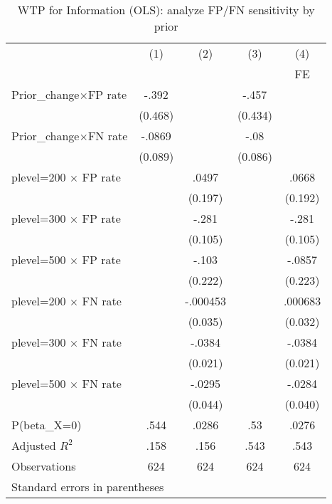 \begin{table}[htbp]\centering
\caption{WTP for Information (OLS): analyze FP/FN sensitivity by prior}
\begin{tabular}{l*{4}{c}}
\hline\hline
                &\multicolumn{1}{c}{(1)}&\multicolumn{1}{c}{(2)}&\multicolumn{1}{c}{(3)}&\multicolumn{1}{c}{(4)}\\
                &\multicolumn{1}{c}{}&\multicolumn{1}{c}{}&\multicolumn{1}{c}{}&\multicolumn{1}{c}{FE}\\
\hline
Prior\_change$\times$FP rate&    -.392&         &    -.457&         \\
                &  (0.468)&         &  (0.434)&         \\
Prior\_change$\times$FN rate&   -.0869&         &     -.08&         \\
                &  (0.089)&         &  (0.086)&         \\
plevel=200 $\times$ FP rate&         &    .0497&         &    .0668\\
                &         &  (0.197)&         &  (0.192)\\
plevel=300 $\times$ FP rate&         &    -.281&         &    -.281\\
                &         &  (0.105)&         &  (0.105)\\
plevel=500 $\times$ FP rate&         &    -.103&         &   -.0857\\
                &         &  (0.222)&         &  (0.223)\\
plevel=200 $\times$ FN rate&         & -.000453&         &  .000683\\
                &         &  (0.035)&         &  (0.032)\\
plevel=300 $\times$ FN rate&         &   -.0384&         &   -.0384\\
                &         &  (0.021)&         &  (0.021)\\
plevel=500 $\times$ FN rate&         &   -.0295&         &   -.0284\\
                &         &  (0.044)&         &  (0.040)\\
\hline
P(beta\_X=0)     &     .544&    .0286&      .53&    .0276\\
Adjusted \(R^{2}\)&     .158&     .156&     .543&     .543\\
Observations    &      624&      624&      624&      624\\
\hline\hline
\multicolumn{5}{l}{\footnotesize Standard errors in parentheses}\\
\end{tabular}
\end{table}

